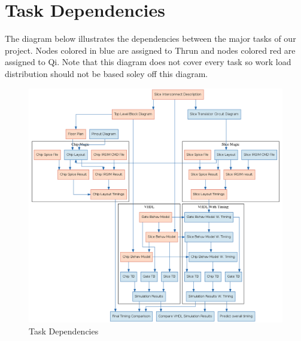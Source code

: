 \documentclass{article}
\begin{document}
\newpage
\section*{Task Dependencies}
The diagram below illustrates the dependencies between the major tasks of our
project. Nodes colored in blue are assigned to Thrun and nodes colored red are
assigned to Qi. Note that this diagram does not cover every task so work load
distribution should not be based soley off this diagram.
\vspace{1cm}
\begin{figure}[H]
    \centering
    \includegraphics[width=\linewidth]{tasks.png}
    \caption{Task Dependencies}
\end{figure}
\end{document}
